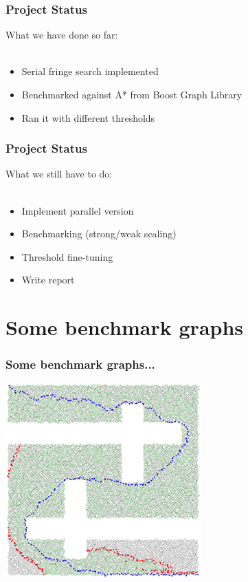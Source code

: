 \documentclass{beamer}
\begin{document}
\begin{frame}
\frametitle{Project Status}
What we have done so far:\\\quad\\
\begin{itemize}
\item Serial fringe search implemented
\item Benchmarked against A* from Boost Graph Library
\item Ran it with different thresholds
\end{itemize}
\end{frame}


\begin{frame}
\frametitle{Project Status}
What we still have to do:\\\quad\\
\begin{itemize}
\item Implement parallel version
\item Benchmarking (strong/weak scaling)
\item Threshold fine-tuning
\item Write report
\end{itemize}
\end{frame}


\section{Some benchmark graphs}

\begin{frame}
\frametitle{Some benchmark graphs...}
\begin{center}
	\includegraphics[height=210pt]{holy.png}
\end{center}
\end{frame}
\end{document}
